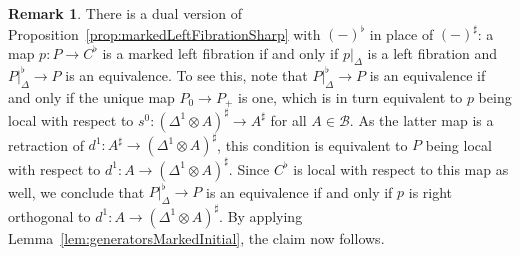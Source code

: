 \documentclass[reqno]{amsart}
\numberwithin{equation}{subsection}
\theoremstyle{plain}
\theoremstyle{definition}
\newtheorem{remark}[equation]{Remark}
\let\scr=\mathcal
\def\BB{\scr B}
\begin{document}
\begin{remark}
	\label{rem:markedLeftFibrationFlat}
	There is a dual version of Proposition~\ref{prop:markedLeftFibrationSharp} with $(-)^\flat$ in place of $(-)^\sharp$: a map $p\colon P\to C^\flat$ is a marked left fibration if and only if $p\vert_{\Delta}$ is a left fibration and $P\vert_{\Delta}^\flat\to P$ is an equivalence. To see this, note that $P\vert_{\Delta}^\flat\to P$ is an equivalence if and only if the unique map $P_0\to P_+$ is one, which is in turn equivalent to $p$ being local with respect to $s^0\colon(\Delta^1\otimes A)^\sharp\to A^\sharp$ for all $A\in\BB$. As the latter map is a retraction of $d^1\colon A^\sharp\to (\Delta^1\otimes A)^\sharp$, this condition is equivalent to $P$ being local with respect to $d^1\colon A\to (\Delta^1\otimes A)^\sharp$. Since $C^\flat$ is local with respect to this map as well, we conclude that $P\vert_{\Delta}^\flat\to P$ is an equivalence if and only if $p$ is right orthogonal to $d^1\colon A\to (\Delta^1\otimes A)^\sharp$. By applying Lemma~\ref{lem:generatorsMarkedInitial}, the claim now follows.
\end{remark}
\end{document}
